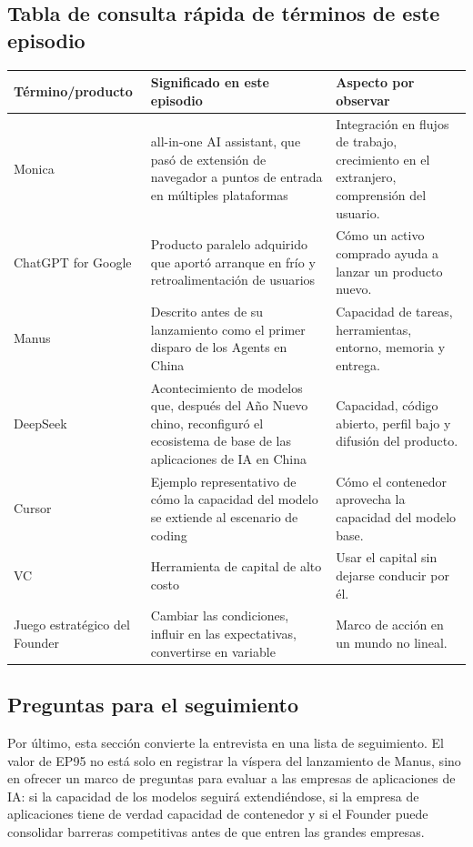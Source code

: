 \documentclass[a4paper]{article}
\begin{document}
\subsection{Tabla de consulta rápida de términos de este episodio}

\noindent\begin{tabularx}{\textwidth}{p{}p{}X}
\toprule
Término/producto & Significado en este episodio & Aspecto por observar \\
\midrule
Monica & all-in-one AI assistant, que pasó de extensión de navegador a puntos de entrada en múltiples plataformas & Integración en flujos de trabajo, crecimiento en el extranjero, comprensión del usuario. \\
ChatGPT for Google & Producto paralelo adquirido que aportó arranque en frío y retroalimentación de usuarios & Cómo un activo comprado ayuda a lanzar un producto nuevo. \\
Manus & Descrito antes de su lanzamiento como el primer disparo de los Agents en China & Capacidad de tareas, herramientas, entorno, memoria y entrega. \\
DeepSeek & Acontecimiento de modelos que, después del Año Nuevo chino, reconfiguró el ecosistema de base de las aplicaciones de IA en China & Capacidad, código abierto, perfil bajo y difusión del producto. \\
Cursor & Ejemplo representativo de cómo la capacidad del modelo se extiende al escenario de coding & Cómo el contenedor aprovecha la capacidad del modelo base. \\
VC & Herramienta de capital de alto costo & Usar el capital sin dejarse conducir por él. \\
Juego estratégico del Founder & Cambiar las condiciones, influir en las expectativas, convertirse en variable & Marco de acción en un mundo no lineal. \\
\bottomrule
\end{tabularx}

\subsection{Preguntas para el seguimiento}

Por último, esta sección convierte la entrevista en una lista de seguimiento. El valor de EP95 no está solo en registrar la víspera del lanzamiento de Manus, sino en ofrecer un marco de preguntas para evaluar a las empresas de aplicaciones de IA: si la capacidad de los modelos seguirá extendiéndose, si la empresa de aplicaciones tiene de verdad capacidad de contenedor y si el Founder puede consolidar barreras competitivas antes de que entren las grandes empresas.
\end{document}
